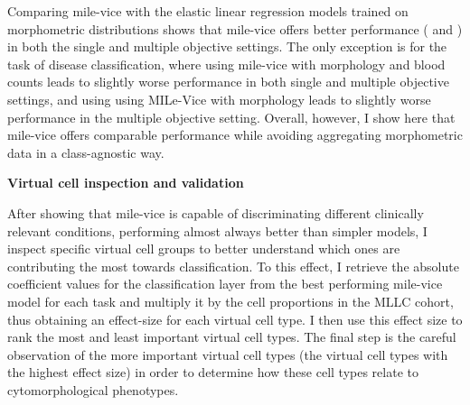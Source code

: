 \begin{figure}[!ht]
    \label{fig:mile-vice-performance}
\end{figure}

Comparing \ac{mile-vice} with the elastic linear regression models trained on morphometric distributions shows that \ac{mile-vice} offers better performance ( and ) in both the single and multiple objective settings. The only exception is for the task of disease classification, where using \ac{mile-vice} with morphology and blood counts leads to slightly worse performance in both single and multiple objective settings, and using using MILe-Vice with morphology leads to slightly worse performance in the multiple objective setting. Overall, however, I show here that \ac{mile-vice} offers comparable performance while avoiding aggregating morphometric data in a class-agnostic way. 

\begin{figure}[!ht]
    \label{fig:mile-vice-vs-glmnet}
\end{figure}

\begin{figure}[!ht]
    \label{fig:mile-vice-vs-glmnet-scatter}
\end{figure}

\noindent \textbf{Virtual cell inspection and validation}

After showing that \ac{mile-vice} is capable of discriminating different clinically relevant conditions, performing almost always better than simpler models, I inspect specific virtual cell groups to better understand which ones are contributing the most towards classification. To this effect, I retrieve the absolute coefficient values for the classification layer from the best performing \ac{mile-vice} model for each task and multiply it by the cell proportions in the MLLC cohort, thus obtaining an effect-size for each virtual cell type. I then use this effect size to rank the most and least important virtual cell types. The final step is the careful observation of the more important virtual cell types (the virtual cell types with the highest effect size) in order to determine how these cell types relate to cytomorphological phenotypes.

